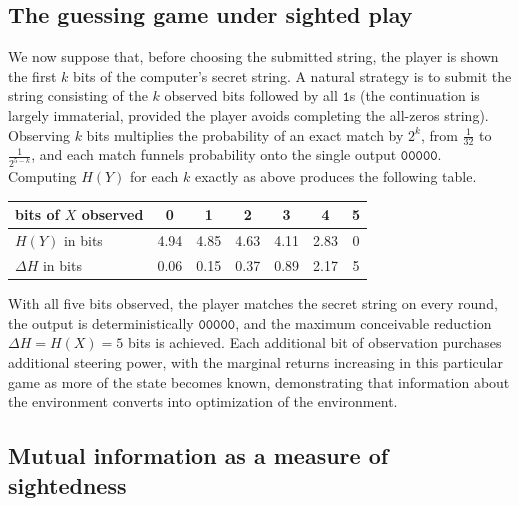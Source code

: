 \documentclass[10pt]{article}
\theoremstyle{definition}
\theoremstyle{remark}
\begin{document}
\subsection{The guessing game under sighted play}
\label{sec:gamesighted}

We now suppose that, before choosing the submitted string, the player is shown the first $k$ bits of the computer's secret string. A natural strategy is to submit the string consisting of the $k$ observed bits followed by all $\texttt{1}$s (the continuation is largely immaterial, provided the player avoids completing the all-zeros string). Observing $k$ bits multiplies the probability of an exact match by $2^k$, from $\frac1{32}$ to $\frac{1}{2^{5-k}}$, and each match funnels probability onto the single output $\texttt{00000}$. Computing $H(Y)$ for each $k$ exactly as above produces the following table.

\begin{center}
\begin{tabular}{lcccccc}
\toprule
bits of $X$ observed & 0 & 1 & 2 & 3 & 4 & 5 \\
\midrule
$H(Y)$ in bits & 4.94 & 4.85 & 4.63 & 4.11 & 2.83 & 0 \\
$\Delta H$ in bits & 0.06 & 0.15 & 0.37 & 0.89 & 2.17 & 5 \\
\bottomrule
\end{tabular}
\end{center}

With all five bits observed, the player matches the secret string on every round, the output is deterministically $\texttt{00000}$, and the maximum conceivable reduction $\Delta H = H(X) = 5$ bits is achieved. Each additional bit of observation purchases additional steering power, with the marginal returns increasing in this particular game as more of the state becomes known, demonstrating that information about the environment converts into optimization of the environment.

\subsection{Mutual information as a measure of sightedness}
\label{sec:misighted}
\end{document}
